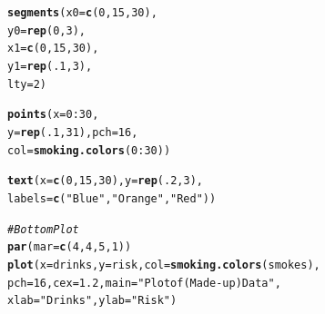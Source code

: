 \documentclass{tufte-book}\usepackage[]{graphicx}\usepackage[]{color}
\makeatletter
\newcommand{\hlnum}[1]{\textcolor[rgb]{0.686,0.059,0.569}{#1}}%
\newcommand{\hlstr}[1]{\textcolor[rgb]{0.192,0.494,0.8}{#1}}%
\newcommand{\hlcom}[1]{\textcolor[rgb]{0.678,0.584,0.686}{\textit{#1}}}%
\newcommand{\hlopt}[1]{\textcolor[rgb]{0,0,0}{#1}}%
\newcommand{\hlstd}[1]{\textcolor[rgb]{0.345,0.345,0.345}{#1}}%
\newcommand{\hlkwc}[1]{\textcolor[rgb]{0.333,0.667,0.333}{#1}}%
\newcommand{\hlkwd}[1]{\textcolor[rgb]{0.737,0.353,0.396}{\textbf{#1}}}%
\newenvironment{kframe}{%
 \def\at@end@of@kframe{}%
 \ifinner\ifhmode%
  \def\at@end@of@kframe{\end{minipage}}%
  \begin{minipage}{\columnwidth}%
 \fi\fi%
 \def\FrameCommand##1{\hskip\@totalleftmargin \hskip-\fboxsep
 \colorbox{shadecolor}{##1}\hskip-\fboxsep
     \hskip-\linewidth \hskip-\@totalleftmargin \hskip\columnwidth}%
 \MakeFramed {\advance\hsize-\width
   \@totalleftmargin\z@ \linewidth\hsize
   \@setminipage}}%
 {\par\unskip\endMakeFramed%
 \at@end@of@kframe}
\newenvironment{knitrout}{}{} %
\makeatother
\begin{document}
\begin{marginfigure}
\begin{tiny}
\begin{knitrout}
\begin{kframe}
\begin{alltt}
\hlkwd{segments}\hlstd{(}\hlkwc{x0} \hlstd{=} \hlkwd{c}\hlstd{(}\hlnum{0}\hlstd{,} \hlnum{15}\hlstd{,} \hlnum{30}\hlstd{),}
         \hlkwc{y0} \hlstd{=} \hlkwd{rep}\hlstd{(}\hlnum{0}\hlstd{,} \hlnum{3}\hlstd{),}
         \hlkwc{x1} \hlstd{=} \hlkwd{c}\hlstd{(}\hlnum{0}\hlstd{,} \hlnum{15}\hlstd{,} \hlnum{30}\hlstd{),}
         \hlkwc{y1} \hlstd{=} \hlkwd{rep}\hlstd{(}\hlnum{.1}\hlstd{,} \hlnum{3}\hlstd{),}
         \hlkwc{lty} \hlstd{=} \hlnum{2}\hlstd{)}

\hlkwd{points}\hlstd{(}\hlkwc{x} \hlstd{=} \hlnum{0}\hlopt{:}\hlnum{30}\hlstd{,}
       \hlkwc{y} \hlstd{=} \hlkwd{rep}\hlstd{(}\hlnum{.1}\hlstd{,} \hlnum{31}\hlstd{),} \hlkwc{pch} \hlstd{=} \hlnum{16}\hlstd{,}
       \hlkwc{col} \hlstd{=} \hlkwd{smoking.colors}\hlstd{(}\hlnum{0}\hlopt{:}\hlnum{30}\hlstd{))}

\hlkwd{text}\hlstd{(}\hlkwc{x} \hlstd{=} \hlkwd{c}\hlstd{(}\hlnum{0}\hlstd{,} \hlnum{15}\hlstd{,} \hlnum{30}\hlstd{),} \hlkwc{y} \hlstd{=} \hlkwd{rep}\hlstd{(}\hlnum{.2}\hlstd{,} \hlnum{3}\hlstd{),}
     \hlkwc{labels} \hlstd{=} \hlkwd{c}\hlstd{(}\hlstr{"Blue"}\hlstd{,} \hlstr{"Orange"}\hlstd{,} \hlstr{"Red"}\hlstd{))}

\hlcom{# Bottom Plot}
\hlkwd{par}\hlstd{(}\hlkwc{mar} \hlstd{=} \hlkwd{c}\hlstd{(}\hlnum{4}\hlstd{,} \hlnum{4}\hlstd{,} \hlnum{5}\hlstd{,} \hlnum{1}\hlstd{))}
\hlkwd{plot}\hlstd{(}\hlkwc{x} \hlstd{= drinks,} \hlkwc{y} \hlstd{= risk,} \hlkwc{col} \hlstd{=} \hlkwd{smoking.colors}\hlstd{(smokes),}
     \hlkwc{pch} \hlstd{=} \hlnum{16}\hlstd{,} \hlkwc{cex} \hlstd{=} \hlnum{1.2}\hlstd{,} \hlkwc{main} \hlstd{=} \hlstr{"Plot of (Made-up) Data"}\hlstd{,}
     \hlkwc{xlab} \hlstd{=} \hlstr{"Drinks"}\hlstd{,} \hlkwc{ylab} \hlstd{=} \hlstr{"Risk"}\hlstd{)}


\end{alltt}
\end{kframe}
\end{knitrout}
\end{tiny}
\end{marginfigure}
\end{document}
